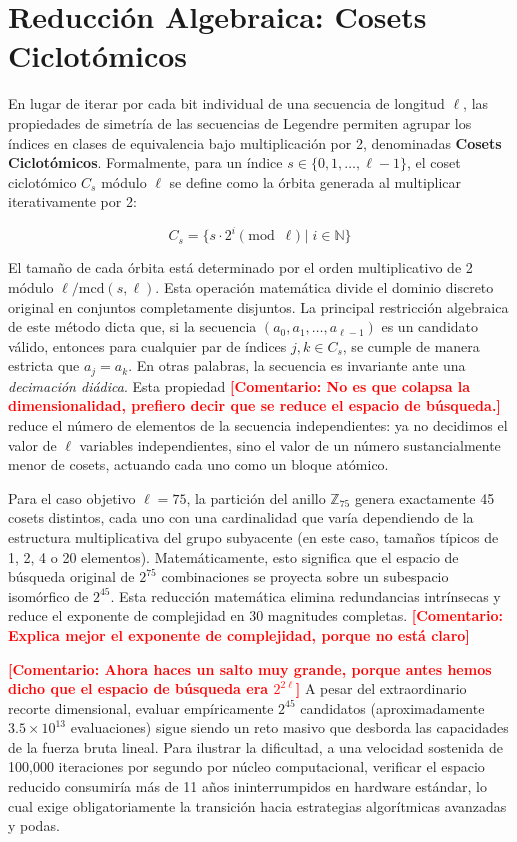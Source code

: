 \documentclass[12pt,a4paper]{tfg_domingo}
\newcommand{\Comentario}[1]{\textcolor{red}{\textbf{[Comentario:
      #1]}}}
\begin{document}
\section{Reducción Algebraica: Cosets Ciclotómicos}

En lugar de iterar por cada bit individual de una secuencia de
longitud $\ell$, las propiedades de simetría de las secuencias de
Legendre permiten agrupar los índices en clases de equivalencia bajo
multiplicación por 2, denominadas \textbf{Cosets
  Ciclotómicos}. Formalmente, para un índice $s \in \{0, 1, \dots,
\ell-1\}$, el coset ciclotómico $C_s$ módulo $\ell$ se define como la órbita
generada al  multiplicar iterativamente por 2:

$$ C_s = \{ s \cdot 2^i \pmod{\ell} \mid i \in \mathbb{N} \} $$

El tamaño de cada órbita está determinado por el orden multiplicativo
de 2 módulo $\ell/\text{mcd}(s, \ell)$. Esta operación matemática divide el
dominio discreto original en conjuntos completamente disjuntos. La
principal restricción algebraica de este método dicta que, si la
secuencia $(a_0, a_1, \dots, a_{\ell-1})$ es un candidato válido,
entonces para cualquier par de índices $j, k \in C_s$, se cumple de
manera estricta que $a_j = a_k$. En otras palabras, la secuencia es
invariante ante una \emph{decimación diádica}. Esta propiedad
\Comentario{No es que colapsa la dimensionalidad, prefiero decir que
  se reduce el espacio de búsqueda.}
reduce el número de elementos de la secuencia independientes: ya no decidimos el valor de $\ell$
variables independientes, sino el valor de un número sustancialmente
menor de cosets, actuando cada uno como un bloque atómico. 

Para el caso objetivo $\ell=75$, la partición del anillo $\mathbb{Z}_{75}$ genera
exactamente 45 cosets distintos, cada uno con una cardinalidad que
varía dependiendo de la estructura multiplicativa del grupo
subyacente (en este caso, tamaños típicos de 1, 2, 4 o 20
elementos). Matemáticamente, esto significa que el espacio de búsqueda
original de $2^{75}$ combinaciones se proyecta sobre un subespacio
isomórfico de $2^{45}$. Esta reducción matemática elimina redundancias
intrínsecas y reduce el exponente de complejidad en 30 magnitudes
completas.  \Comentario{Explica mejor el exponente de complejidad,
  porque no está claro}


\Comentario{Ahora haces un salto muy grande, porque antes hemos dicho
  que el espacio de búsqueda era $2^{2\ell}$}
A pesar del extraordinario recorte dimensional, evaluar empíricamente
$2^{45}$ candidatos (aproximadamente $3.5 \times 10^{13}$ evaluaciones)
sigue siendo un reto masivo que desborda las capacidades de la fuerza
bruta lineal. Para ilustrar la dificultad, a una velocidad sostenida
de 100,000 iteraciones por segundo por núcleo computacional, verificar
el espacio reducido consumiría más de 11 años ininterrumpidos en
hardware estándar, lo cual exige obligatoriamente la transición hacia
estrategias algorítmicas avanzadas y podas. 
\end{document}
